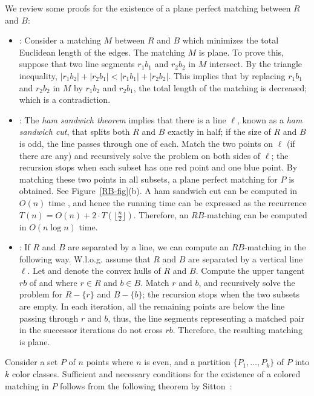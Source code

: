 \documentclass[11pt,a4paper]{article}
\newcommand{\CH}[1]{\text{$CH(#1)$}}
\newcommand{\Min}[2]{\text{\sf Min$(#1,#2)$}}
\newcommand{\Cut}[2]{\text{\sf Cut$(#1,#2)$}}
\newcommand{\Tangent}[2]{\text{\sf Tangent$(#1,#2)$}}
\begin{document}
We review some proofs for the existence of a plane perfect matching between $R$ and $B$:
\begin{itemize}
\item {\Min{R}{B}:} Consider a matching $M$ between $R$ and $B$ which minimizes the total Euclidean length of the edges. The matching $M$ is plane. To prove this, suppose that two line segments $r_1b_1$ and $r_2b_2$ in $M$ intersect. By the triangle inequality, $|r_1b_2|+|r_2b_1|<|r_1b_1|+|r_2b_2|$. This implies that by replacing $r_1b_1$ and $r_2b_2$ in $M$ by $r_1b_2$ and $r_2b_1$, the total length of the matching is decreased; which is a contradiction.

\item {\Cut{R}{B}:} The {\em ham sandwich theorem} implies that there is a line $\ell$, known as a {\em ham sandwich cut}, that splits both $R$ and $B$ exactly in half; if the size of $R$ and $B$ is odd, the line passes through one of each. Match the two points on $\ell$ (if there are any) and recursively solve the problem on both sides of $\ell$; the recursion stops when each subset has one red point and one blue point. By matching these two points in all subsets, a plane perfect matching for $P$ is obtained. See Figure~\ref{RB-fig}(b). A ham sandwich cut can be computed in $O(n)$ time \cite{Lo1994}, and hence the running time can be expressed as the recurrence $T(n)=O(n)+2\cdot T(\lfloor\frac{n}{2}\rfloor)$. Therefore, an $RB$-matching can be computed in $O(n\log n)$ time. 

\item {\Tangent{R}{B}:} If $R$ and $B$ are separated by a line, we can compute an $RB$-matching in the following way. W.l.o.g. assume that $R$ and $B$ are separated by a vertical line $\ell$. Let \CH{R} and \CH{B} denote the convex hulls of $R$ and $B$. Compute the upper tangent $rb$ of \CH{R} and \CH{B} where $r\in R$ and $b\in B$. Match $r$ and $b$, and recursively solve the problem for $R-\{r\}$ and $B-\{b\}$; the recursion stops when the two subsets are empty. In each iteration, all the remaining points are below the line passing through $r$ and $b$, thus, the line segments representing a matched pair in the successor iterations do not cross $rb$. Therefore, the resulting matching is plane.
\end{itemize}

Consider a set $P$ of $n$ points where $n$ is even, and a partition $\{P_1,\dots,P_k\}$ of $P$ into $k$ color classes. Sufficient and necessary conditions for the existence of a colored matching in $P$ follows from the following theorem by Sitton~\cite{Sitton1996}:
\end{document}
